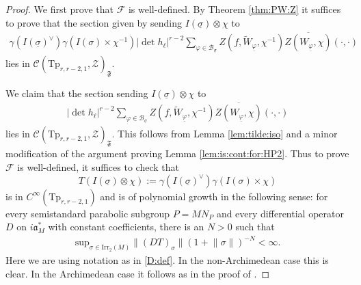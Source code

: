 \documentclass[12pt]{amsart}
\theoremstyle{remark}
\numberwithin{equation}{section}
\theoremstyle{definition}
\numberwithin{equation}{subsection}
\newcommand{\norm}[1]{\lVert#1\rVert}
\begin{document}
\begin{proof} 
We first prove that $\mathcal{F}$ is well-defined.  By Theorem \ref{thm:PW:Z} it suffices to prove that the section given by sending $I(\underline{\sigma}) \otimes \chi$ to
\begin{align*} 
\gamma(I(\underline{\sigma})^\vee)\gamma(I(\sigma)\times \chi^{-1})
    |\det h_\ell|^{r-2}\sum_{\varphi \in \mathcal{B}_{\underline{\sigma}}} Z(f,\widetilde{W}_{\underline{\varphi}},\chi^{-1})\overline{Z\left(W_{\underline{\varphi}},\chi\right)}(\cdot,\cdot)
\end{align*}
    lies in $\mathcal{C}(\mathrm{Tp}_{r,r-2,1},\mathcal{Z})_\mathfrak{F}$. 

We claim that the section sending $I(\underline{\sigma}) \otimes \chi$ to 
\begin{align} \label{section:good}
|\det h_\ell|^{r-2}\sum_{\varphi \in \mathcal{B}_{\underline{\sigma}}} Z(f,\widetilde{W}_{\underline{\varphi}},\chi^{-1})\overline{Z\left(W_{\underline{\varphi}},\chi\right)}(\cdot,\cdot)
\end{align}
lies in $\mathcal{C}(\mathrm{Tp}_{r,r-2,1},\mathcal{Z})_{\mathfrak{F}}.$
This follows from Lemma \ref{lem:tilde:iso}
and a minor modification of the argument proving Lemma \ref{lem:is:cont:for:HP2}.  Thus to prove $\mathcal{F}$ is well-defined, it suffices to check that 
$$
T(I(\underline{\sigma}) \otimes \chi):= \gamma(I(\underline{\sigma})^{\vee})\gamma(I(\sigma) \times \chi)
$$
is in $C^\infty(\mathrm{Tp}_{r,r-2,1})$ and is of polynomial growth in the following sense: for every semistandard parabolic subgroup $P=MN_P$ and every differential operator $D$ on $i\mathfrak{a}_M^\ast$ with constant coefficients, there is an $N>0$ such that 
\begin{align} \label{poly:growth} 
\mathrm{sup}_{\sigma \in \mathrm{Irr}_2(M)}\norm{(DT)_{\sigma}}(1+\norm{\sigma})^{-N}<\infty.
\end{align}
Here we are using notation as in \eqref{D:def}.
  In
the non-Archimedean case this is clear.  In the Archimedean case it follows as in the proof of \cite[Lemma 4.2]{DRS:Schwartz}.
    

\end{proof}
\end{document}
